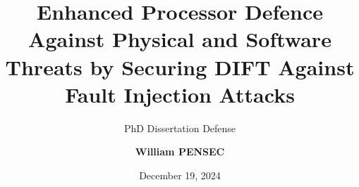 \title{Enhanced Processor Defence Against Physical and Software Threats by Securing DIFT Against Fault Injection Attacks}
\subtitle{PhD Dissertation Defense}
\author[
    William PENSEC
]{
    \textbf{William PENSEC}
}
\date{December 19, 2024}

